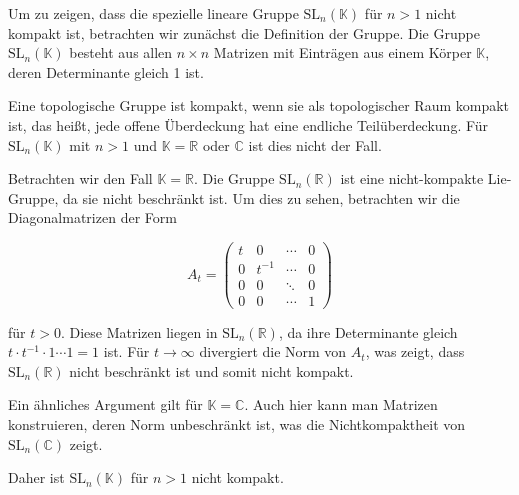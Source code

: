 Um zu zeigen, dass die spezielle lineare Gruppe $\mathrm{SL}_n(\mathbb{K})$ für $n > 1$ nicht kompakt ist, betrachten wir zunächst die Definition der Gruppe. Die Gruppe $\mathrm{SL}_n(\mathbb{K})$ besteht aus allen $n \times n$ Matrizen mit Einträgen aus einem Körper $\mathbb{K}$, deren Determinante gleich 1 ist. 

Eine topologische Gruppe ist kompakt, wenn sie als topologischer Raum kompakt ist, das heißt, jede offene Überdeckung hat eine endliche Teilüberdeckung. Für $\mathrm{SL}_n(\mathbb{K})$ mit $n > 1$ und $\mathbb{K} = \mathbb{R}$ oder $\mathbb{C}$ ist dies nicht der Fall.

Betrachten wir den Fall $\mathbb{K} = \mathbb{R}$. Die Gruppe $\mathrm{SL}_n(\mathbb{R})$ ist eine nicht-kompakte Lie-Gruppe, da sie nicht beschränkt ist. Um dies zu sehen, betrachten wir die Diagonalmatrizen der Form

\[
A_t = \begin{pmatrix}
t & 0 & \cdots & 0 \\
0 & t^{-1} & \cdots & 0 \\
0 & 0 & \ddots & 0 \\
0 & 0 & \cdots & 1
\end{pmatrix}
\]

für $t > 0$. Diese Matrizen liegen in $\mathrm{SL}_n(\mathbb{R})$, da ihre Determinante gleich $t \cdot t^{-1} \cdot 1 \cdots 1 = 1$ ist. Für $t \to \infty$ divergiert die Norm von $A_t$, was zeigt, dass $\mathrm{SL}_n(\mathbb{R})$ nicht beschränkt ist und somit nicht kompakt.

Ein ähnliches Argument gilt für $\mathbb{K} = \mathbb{C}$. Auch hier kann man Matrizen konstruieren, deren Norm unbeschränkt ist, was die Nichtkompaktheit von $\mathrm{SL}_n(\mathbb{C})$ zeigt.

Daher ist $\mathrm{SL}_n(\mathbb{K})$ für $n > 1$ nicht kompakt.